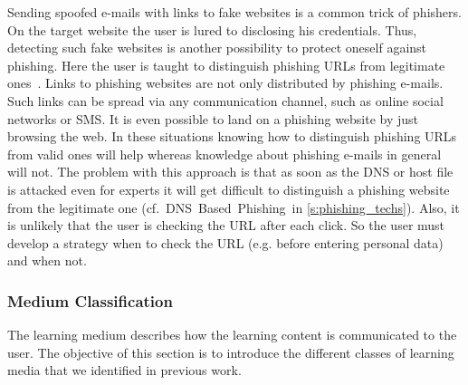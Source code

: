 \begin{description}[leftmargin=0cm]
	\item[URL Based Knowledge] Sending spoofed e-mails with links to fake websites is a common trick of phishers.
 On the target website the user is lured to disclosing his credentials.
 Thus, detecting such fake websites is another possibility to protect oneself against phishing.
 Here the user is taught to distinguish phishing URLs from legitimate ones~\cite{sheng2007antiphishingphil, arachchilage2012designing}. 
Links to phishing websites are not only distributed by phishing e-mails.
 Such links can be spread via any communication channel, such as online social networks or SMS.
 It is even possible to land on a phishing website by just browsing the web.
 In these situations knowing how to distinguish phishing URLs from valid ones will help whereas knowledge about phishing e-mails in general will not.
 The problem with this approach is that as soon as the DNS or host file is attacked even for experts it will get difficult to distinguish a phishing website from the legitimate one (cf.~DNS~Based~Phishing~in \autoref{s:phishing_techs}).
 Also, it is unlikely that the user is checking the URL after each click. So the user must develop a strategy when to check the URL (e.g. before entering personal data) and when not.

\end{description}


\subsubsection{Medium Classification}
\label{s:medium_classification}
The learning medium describes how the learning content is communicated to the user. 
The objective of this section is to introduce the different classes of learning media that we identified in previous work.

